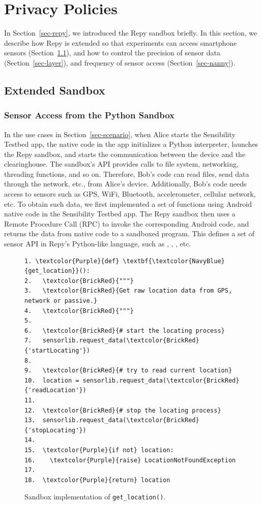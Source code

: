 \section{Privacy Policies}\label{sec-policy}

In Section~\ref{sec-repy}, we introduced the Repy sandbox briefly. 
In this section, we describe how Repy is extended so that experiments
can access smartphone sensors (Section~\ref{sec-repy-ext}), and 
how to control the precision of sensor data (Section~\ref{sec-layer}), 
and frequency of sensor access (Section~\ref{sec-nanny}).

\subsection{Extended Sandbox}\label{sec-repy-ext}

\subsubsection{Sensor Access from the Python Sandbox}

In the use cases in Section~\ref{sec-scenario}, when Alice starts 
the Sensibility Testbed app, the native code in the app initializes a
Python interpreter, launches the Repy sandbox, and starts the 
communication between the device and the clearinghouse. The 
sandbox's API provides calls to file system, networking, 
threading functions, and so on. Therefore, Bob's code can read 
files, send data through the network, etc., from Alice's device. 
Additionally, Bob's code needs access to sensors such as GPS, 
WiFi, Bluetooth, accelerometer, cellular network, etc. To obtain 
such data, we first implemented a set of functions using
Android native code in the Sensibility Testbed app. The Repy 
sandbox then uses a Remote Procedure Call (RPC) to invoke the
corresponding Android code, and returns the data from native code 
to a sandboxed program. This defines a set of sensor API in 
Repy's Python-like language, such as , 
, , etc. 

\begin{figure}
\begin{Verbatim}
1. \textcolor{Purple}{def} \textbf{\textcolor{NavyBlue}{get_location}}():
2.   \textcolor{BrickRed}{"""}
3.   \textcolor{BrickRed}{Get raw location data from GPS, network or passive.}
4.   \textcolor{BrickRed}{"""}
5. 
6.   \textcolor{BrickRed}{# start the locating process} 
7.   sensorlib.request_data(\textcolor{BrickRed}{'startLocating'})
8.
9.   \textcolor{BrickRed}{# try to read current location}
10.  location = sensorlib.request_data(\textcolor{BrickRed}{'readLocation'})
11.
12.  \textcolor{BrickRed}{# stop the locating process} 
13.  sensorlib.request_data(\textcolor{BrickRed}{'stopLocating'})
14.
15.  \textcolor{Purple}{if not} location:
16.    \textcolor{Purple}{raise} LocationNotFoundException    
17.  
18.  \textcolor{Purple}{return} location
\end{Verbatim}
\caption{\small Sandbox implementation of \texttt{get\_location()}. 
\label{fig-getlocation}}
\end{figure}

